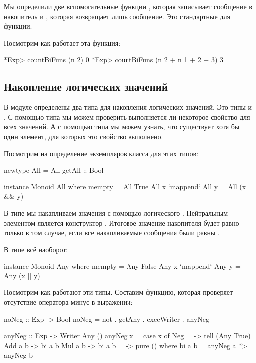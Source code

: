 Мы определили две вспомогательные функции , которая
записывает сообщение в накопитель и , 
которая возвращает лишь сообщение. Это стандартные для
 функции.

Посмотрим как работает эта функция:

\begin{code}
*Exp> countBiFuns (n 2)
0
*Exp> countBiFuns (n 2 + n 1 + 2 + 3)
3
\end{code}

\subsection{Накопление логических значений}

В модуле  определены два типа для 
накопления логических значений. Это типы  
и . С помощью типа  мы можем проверить
выполняется ли некоторое свойство для всех значений. 
А с помощью типа  мы можем узнать, что существует хотя
бы один элемент, для которых это свойство выполнено.

Посмотрим на определение экземпляров класса 
для этих типов:

\begin{code}
newtype All = All { getAll :: Bool }

instance Monoid All where
        mempty = All True
        All x `mappend` All y = All (x && y)
\end{code}

В типе  мы накапливаем значения с помощью 
логического . Нейтральным элементом является
конструктор . Итоговое значение накопителя будет
равно  только в том случае, если все накапливаемые
сообщения были равны .

В типе  всё наоборот:

\begin{code}
instance Monoid Any where
        mempty = Any False
        Any x `mappend` Any y = Any (x || y)
\end{code}

Посмотрим как работают эти типы. Составим функцию,
которая проверяет отсутствие оператора минус в выражении:

\begin{code}
noNeg :: Exp -> Bool
noNeg = not . getAny . execWriter . anyNeg

anyNeg :: Exp -> Writer Any ()
anyNeg x = case x of
    Neg _   -> tell (Any True)
    Add a b -> bi a b
    Mul a b -> bi a b
    _       -> pure ()
    where bi a b = anyNeg a *> anyNeg b            
\end{code}

